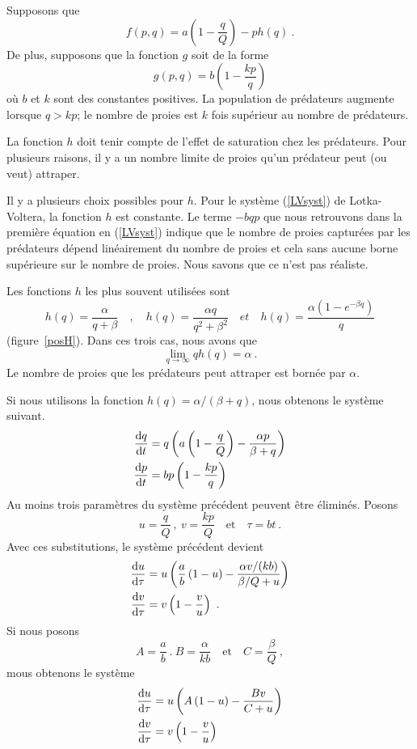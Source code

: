 {Supposons que
\[
f(p,q) = a\left( 1 - \frac{q}{Q}\right) - p h(q) \ .
\]
De plus, supposons que la fonction $g$ soit de la forme
\[
g(p,q) = b\left(1 - \frac{k p}{q}\right)
\]
où $b$ et $k$ sont des constantes positives.  La population de prédateurs
augmente lorsque  $q > kp$; le nombre de proies est $k$ fois supérieur au
nombre de prédateurs.

La fonction $h$ doit tenir compte de l'effet de saturation chez les
prédateurs.  Pour plusieurs raisons, il y a un nombre limite de proies
qu'un prédateur peut (ou veut) attraper.

Il y a plusieurs choix possibles pour $h$.   Pour le système (\ref{LVsyst})
de Lotka-Voltera, la fonction $h$ est constante.  Le terme $-b q p$ que nous
retrouvons dans la première équation en (\ref{LVsyst}) indique que le nombre de
proies capturées par les prédateurs dépend linéairement du nombre de
proies et cela sans aucune borne supérieure sur le nombre de proies.
Nous savons que ce n'est pas réaliste.

Les fonctions $h$ les plus souvent utilisées sont
\[
h(q) = \frac{\alpha}{q + \beta} \quad ,
\quad h(q) = \frac{\alpha q}{q^2 + \beta^2}
\quad {et} \quad h(q) = \frac{\alpha(1-e^{-\beta q})}{q}
\]
(figure~\ref{posH}).  Dans ces trois cas, nous avons que
\[
\lim_{q\rightarrow \infty} q h(q) = \alpha \ .
\]
Le nombre de proies que les prédateurs peut attraper est bornée par $\alpha$.


Si nous utilisons la fonction $h(q) = \alpha /(\beta+ q)$, nous
obtenons le système suivant.
\begin{equation} \label{prepro_model}
\begin{split}
\frac{\mathrm{d}q}{\mathrm{d}t} &= q \left( a\left( 1 - \frac{q}{Q}\right) -
\frac{\alpha p}{\beta + q} \right) \\
\frac{\mathrm{d}p}{\mathrm{d}t} &= b p \left(1 - \frac{k p}{q}\right)
\end{split}
\end{equation}
Au moins trois paramètres du système précédent peuvent être éliminés.  Posons
\[
u=\frac{q}{Q} \ , \ v = \frac{k p}{Q} \quad \text{et} \quad \tau = b t \ .
\]
Avec ces substitutions, le système précédent devient
\begin{align*}
\frac{\mathrm{d}u}{\mathrm{d}\tau} &= u \left( \frac{a}{b}\left( 1 - u\right) -
\frac{\alpha v/(k b)}{\beta/Q + u} \right) \\
\frac{\mathrm{d}v}{\mathrm{d}\tau} &= v \left(1 - \frac{v}{u}\right) \ .
\end{align*}
Si nous posons
\[
A = \frac{a}{b} \ . \ B = \frac{\alpha}{k b} \quad \text{et} \quad
C = \frac{\beta}{Q} \ ,
\]
mous obtenons le système
\begin{equation} \label{prepro_red_mod}
\begin{split}
\frac{\mathrm{d}u}{\mathrm{d}\tau} &= u \left( A\left( 1 - u\right) - \frac{B v}{C + u} \right) \\
\frac{\mathrm{d}v}{\mathrm{d}\tau} &= v \left(1 - \frac{v}{u}\right)
\end{split}
\end{equation}

}
